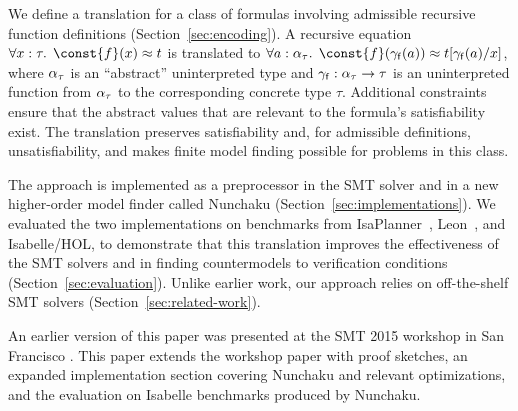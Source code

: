 We define a translation for a class of
formulas involving admissible recursive function definitions
(Section~\ref{sec:encoding}). A
recursive equation $\forall x : \tau.\;\, \const{f}(x) \teq t$
is translated to
$\forall a :\nobreak
\fargtype{\tau}.\allowbreak\;\, \const{f}(\farg{\con{f}}(a)) \teq t[\farg{\con{f}}(a)/x]$, where
$\alpha_{\tau}$ is an ``abstract'' uninterpreted type and $\gamma_{\mathsf{f}} :
\alpha_{\tau} \to \tau$ is an uninterpreted function
from $\alpha_{\tau}$ to the corresponding concrete type $\tau$. 
Additional constraints ensure that the abstract values that are relevant
to the formula's satisfiability
exist. The translation preserves satisfiability and, for admissible definitions,
unsatisfiability, and makes finite model finding possible for problems in this
class.

The approach is implemented as a preprocessor in the SMT solver
\cvc and in a new higher-order model finder called Nunchaku
(Section~\ref{sec:implementations}).
%
We evaluated the two implementations on benchmarks from
IsaPlanner~\cite{DBLP:conf/itp/JohanssonDB10}, Leon~\cite{blanc2013overview},
and Isabelle/HOL, to demonstrate that this translation improves the
effectiveness of the SMT solvers \cvc and \ziii in finding countermodels to
verification conditions (Section~\ref{sec:evaluation}). Unlike earlier work,
our approach relies on off-the-shelf SMT solvers
(Section~\ref{sec:related-work}).

An earlier version of this paper was presented at the SMT 2015 workshop in San
Francisco \cite{reynolds-et-al-2015-smt}. This paper extends the workshop
paper with proof sketches, an expanded implementation section covering
Nunchaku and relevant \cvc optimizations, %
and the evaluation on Isabelle benchmarks produced by Nunchaku.

